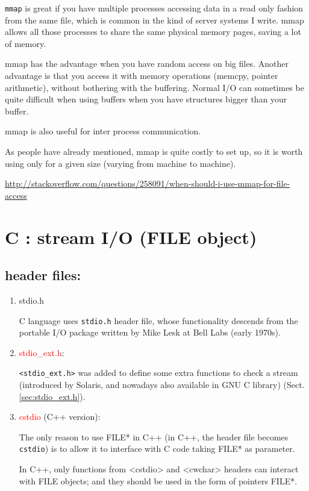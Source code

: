 \verb!mmap! is great if you have multiple processes accessing data in a read
only fashion from the same file, which is common in the kind of server systems I
write. mmap allows all those processes to share the same physical memory pages,
saving a lot of memory.

mmap has the advantage when you have random access on big files. Another
advantage is that you access it with memory operations (memcpy, pointer arithmetic), without bothering with the buffering.
Normal I/O can sometimes be quite difficult when using buffers when you have
structures bigger than your buffer. 


mmap is also useful for inter process communication.


As people have already mentioned, mmap is quite costly to set up, so it is worth
using only for a given size (varying from machine to machine).


\url{http://stackoverflow.com/questions/258091/when-should-i-use-mmap-for-file-access}

\section{C : stream I/O (FILE object)}
\label{sec:C-stream-IO}

\subsection{header files: }

\begin{enumerate}
  \item stdio.h
  
C language uses \verb!stdio.h! header file, whose functionality descends from
the portable I/O package written by Mike Lesk at Bell Labs (early 1970s).
  
  \item \textcolor{red}{stdio\_ext.h}:

\verb!<stdio_ext.h>! was added to define some extra functions to check a
stream (introduced by Solaris, and nowadays also available in GNU C library)
(Sect.\ref{sec:stdio_ext.h}).

  \item \textcolor{red}{cstdio} (C++ version):

The only reason to use FILE* in C++ (in C++, the header file becomes
\verb!cstdio!) is to allow it to interface with C code taking FILE* as
parameter. 

In C++, only functions from <cstdio> and <cwchar> headers can
interact with FILE objects; and they should be used in the form of pointers
FILE*.  
\end{enumerate}


